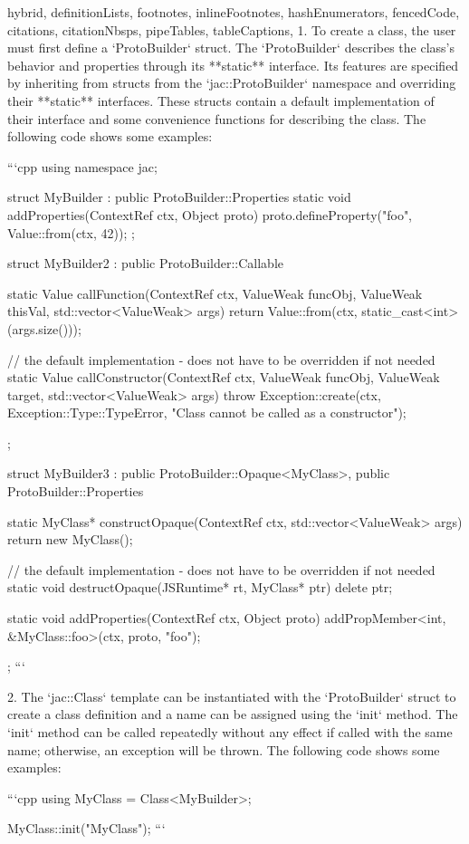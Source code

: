 \documentclass[
  digital,
  oneside,
  nosansbold,
  nocolorbold,
  lof,
  lot
]{fithesis4}
\begin{document}
\begin{markdown*}{%
  hybrid,
  definitionLists,
  footnotes,
  inlineFootnotes,
  hashEnumerators,
  fencedCode,
  citations,
  citationNbsps,
  pipeTables,
  tableCaptions,
}
  1. To create a class, the user must first define a `ProtoBuilder` struct. The `ProtoBuilder` describes the class's behavior and properties through its **static** interface. Its features are specified by inheriting from structs from the `jac::ProtoBuilder` namespace and overriding their **static** interfaces. These structs contain a default implementation of their interface and some convenience functions for describing the class. The following code shows some examples:

```cpp
using namespace jac;

struct MyBuilder : public ProtoBuilder::Properties {
    static void addProperties(ContextRef ctx, Object proto) {
        proto.defineProperty("foo", Value::from(ctx, 42));
    }
};

struct MyBuilder2 : public ProtoBuilder::Callable {
    static Value callFunction(ContextRef ctx, ValueWeak funcObj, ValueWeak thisVal, std::vector<ValueWeak> args) {
        return Value::from(ctx, static_cast<int>(args.size()));
    }

    // the default implementation - does not have to be overridden if not needed
    static Value callConstructor(ContextRef ctx, ValueWeak funcObj, ValueWeak target, std::vector<ValueWeak> args) {
        throw Exception::create(ctx, Exception::Type::TypeError, "Class cannot be called as a constructor");
    }
};

struct MyBuilder3 : public ProtoBuilder::Opaque<MyClass>, public ProtoBuilder::Properties {
    static MyClass* constructOpaque(ContextRef ctx, std::vector<ValueWeak> args) {
        return new MyClass();
    }

    // the default implementation - does not have to be overridden if not needed
    static void destructOpaque(JSRuntime* rt, MyClass* ptr) {
        delete ptr;
    }

    static void addProperties(ContextRef ctx, Object proto) {
        addPropMember<int, &MyClass::foo>(ctx, proto, "foo");
    }
};
```

  2. The `jac::Class` template can be instantiated with the `ProtoBuilder` struct to create a class definition and a name can be assigned using the `init` method. The `init` method can be called repeatedly without any effect if called with the same name; otherwise, an exception will be thrown. The following code shows some examples:

```cpp
using MyClass = Class<MyBuilder>;

MyClass::init("MyClass");
```


\end{markdown*}
\end{document}
